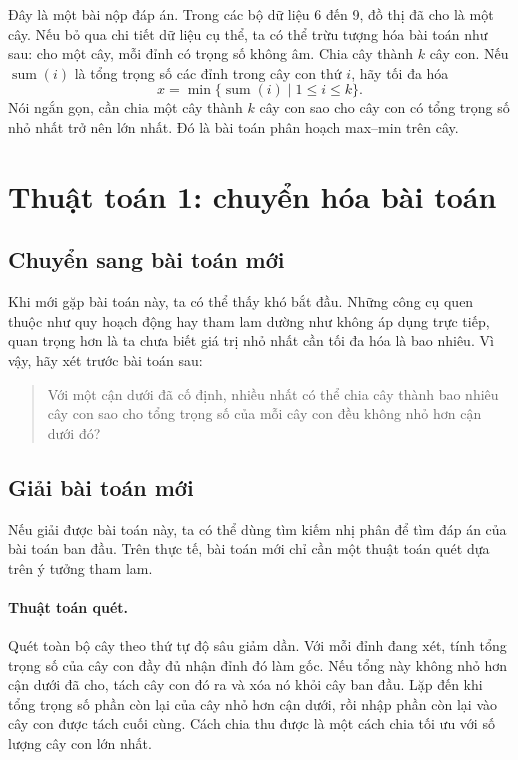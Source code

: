 \documentclass[11pt]{article}
\begin{document}
Đây là một bài nộp đáp án. Trong các bộ dữ liệu 6 đến 9, đồ thị đã cho là một
cây. Nếu bỏ qua chi tiết dữ liệu cụ thể, ta có thể trừu tượng hóa bài toán
như sau: cho một cây, mỗi đỉnh có trọng số không âm. Chia cây thành $k$ cây
con. Nếu $\operatorname{sum}(i)$ là tổng trọng số các đỉnh trong cây con thứ
$i$, hãy tối đa hóa
\[
  x=\min\{\operatorname{sum}(i)\mid 1\le i\le k\}.
\]
Nói ngắn gọn, cần chia một cây thành $k$ cây con sao cho cây con có tổng trọng
số nhỏ nhất trở nên lớn nhất. Đó là bài toán phân hoạch max--min trên cây.

\section{Thuật toán 1: chuyển hóa bài toán}

\subsection{Chuyển sang bài toán mới}

Khi mới gặp bài toán này, ta có thể thấy khó bắt đầu. Những công cụ quen thuộc
như quy hoạch động hay tham lam dường như không áp dụng trực tiếp, quan trọng
hơn là ta chưa biết giá trị nhỏ nhất cần tối đa hóa là bao nhiêu. Vì vậy, hãy
xét trước bài toán sau:

\begin{quote}
Với một cận dưới đã cố định, nhiều nhất có thể chia cây thành bao nhiêu cây
con sao cho tổng trọng số của mỗi cây con đều không nhỏ hơn cận dưới đó?
\end{quote}

\subsection{Giải bài toán mới}

Nếu giải được bài toán này, ta có thể dùng tìm kiếm nhị phân để tìm đáp án của
bài toán ban đầu. Trên thực tế, bài toán mới chỉ cần một thuật toán quét dựa
trên ý tưởng tham lam.

\paragraph{Thuật toán quét.}
Quét toàn bộ cây theo thứ tự độ sâu giảm dần. Với mỗi đỉnh đang xét, tính tổng
trọng số của cây con đầy đủ nhận đỉnh đó làm gốc. Nếu tổng này không nhỏ hơn
cận dưới đã cho, tách cây con đó ra và xóa nó khỏi cây ban đầu. Lặp đến khi
tổng trọng số phần còn lại của cây nhỏ hơn cận dưới, rồi nhập phần còn lại vào
cây con được tách cuối cùng. Cách chia thu được là một cách chia tối ưu với số
lượng cây con lớn nhất.
\end{document}
